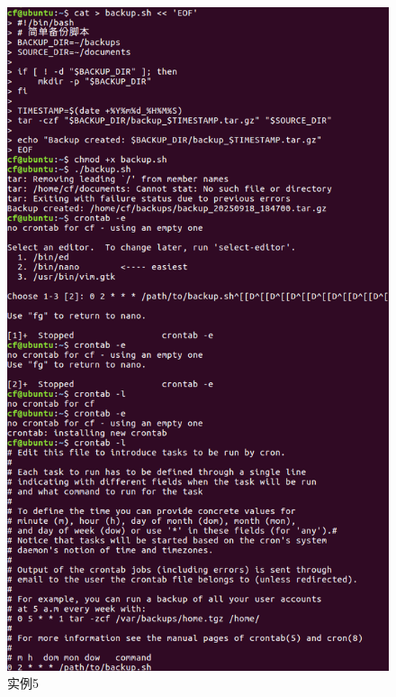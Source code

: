 \documentclass[cn,12pt]{report}
\begin{document}
{    \begin{figure}[htbp]
    \centering
    \includegraphics[width=1\textwidth]{image/5.png}
    \caption{实例5}
  \end{figure}
\FloatBarrier
   
}
\end{document}
